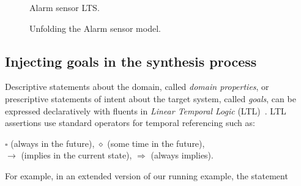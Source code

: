 \begin{figure}[H]
\centering
{}
\caption{Alarm sensor LTS\label{Fig:AlarmSensor}.}
\end{figure}

\begin{figure}[H]
\centering
{}
\caption{Unfolding the Alarm sensor model\label{Fig:AlarmSensor:Unfolding}.}
\end{figure}

\subsection{Injecting goals in the synthesis process\label{subsection:induction-pruning-with-goals}}

Descriptive statements about the domain, called \textsl{domain properties}, or prescriptive statements of intent about the target system, called \textsl{goals}, can be expressed declaratively with fluents in \textsl{Linear Temporal Logic} (LTL)~\cite{Giannakopoulou:2003}. LTL assertions use standard operators for temporal referencing such as:

\begin{center}
$\square$ (always in the future), $\diamond$ (some time in the future),\\
$\rightarrow$ (implies in the current state), $\Rightarrow$ (always implies).\\
\end{center}

For example, in an extended version of our running example, the statement

